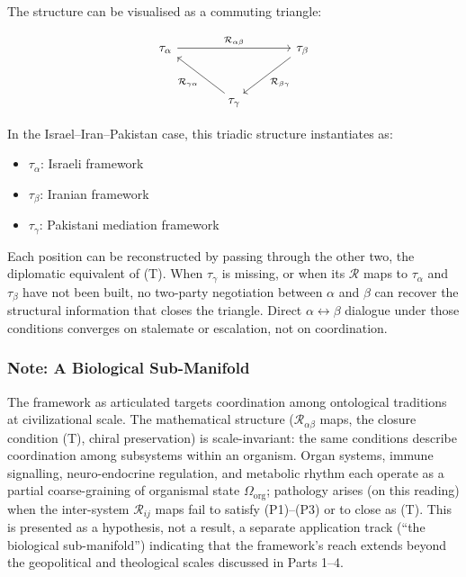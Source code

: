 \documentclass[
]{article}
\providecommand{\tightlist}{%
  \setlength{\itemsep}{0pt}\setlength{\parskip}{0pt}}
\begin{document}
The structure can be visualised as a commuting triangle:

\[
\begin{tikzcd}[column sep=large, row sep=large]
\tau_\alpha \arrow[rr, "\mathcal{R}_{\alpha\beta}"] \arrow[dr, leftarrow, "\mathcal{R}_{\gamma\alpha}"'] & & \tau_\beta \arrow[dl, "\mathcal{R}_{\beta\gamma}"] \\
& \tau_\gamma &
\end{tikzcd}
\]

In the Israel--Iran--Pakistan case, this triadic structure instantiates
as:

\begin{itemize}
\tightlist
\item
  \(\tau_\alpha\): Israeli framework
\item
  \(\tau_\beta\): Iranian framework
\item
  \(\tau_\gamma\): Pakistani mediation framework
\end{itemize}

Each position can be reconstructed by passing through the other two, the
diplomatic equivalent of (T). When \(\tau_\gamma\) is missing, or when
its \(\mathcal{R}\) maps to \(\tau_\alpha\) and \(\tau_\beta\) have not
been built, no two-party negotiation between \(\alpha\) and \(\beta\)
can recover the structural information that closes the triangle. Direct
\(\alpha \leftrightarrow \beta\) dialogue under those conditions
converges on stalemate or escalation, not on coordination.

\subsubsection{Note: A Biological
Sub-Manifold}\label{note-a-biological-sub-manifold}

The framework as articulated targets coordination among ontological
traditions at civilizational scale. The mathematical structure
(\(\mathcal{R}_{\alpha\beta}\) maps, the closure condition (T), chiral
preservation) is scale-invariant: the same conditions describe
coordination among subsystems within an organism. Organ systems, immune
signalling, neuro-endocrine regulation, and metabolic rhythm each
operate as a partial coarse-graining of organismal state
\(\Omega_{\mathrm{org}}\); pathology arises (on this reading) when the
inter-system \(\mathcal{R}_{ij}\) maps fail to satisfy (P1)--(P3) or to
close as (T). This is presented as a hypothesis, not a result, a
separate application track (``the biological sub-manifold'') indicating
that the framework's reach extends beyond the geopolitical and
theological scales discussed in Parts 1--4.
\end{document}
